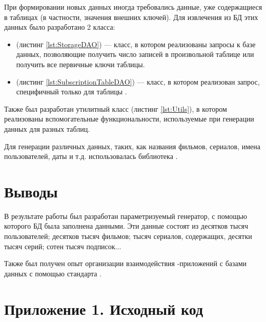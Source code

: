 \begin{enumerate}
	При формировании новых данных иногда требовались данные, уже содержащиеся в таблицах (в частности, значения внешних ключей). Для извлечения из БД этих данных было разработано 2 класса: 
	
	\begin{itemize}
		\item {} (листинг \ref{lst:StorageDAO}) --- класс, в котором реализованы  запросы к базе данных, позволяющие получить число записей в произвольной таблице или получить все первичные ключи таблицы.
		\item {} (листинг \ref{lst:SubscriptionTableDAO}) --- класс, в котором реализован  запрос, специфичный только для таблицы .
	\end{itemize}
	
	Также был разработан утилитный класс  (листинг \ref{lst:Utils}), в котором реализованы вспомогательные функциональности, используемые при генерации данных для разных таблиц.
	
	Для генерации различных данных, таких, как названия фильмов, сериалов, имена пользователей, даты и т.д. использовалась библиотека .
	
\end{enumerate}

\section{Выводы}

В результате работы был разработан параметризуемый генератор, с помощью которого БД была заполнена данными. Эти данные состоят из десятков тысяч пользователей; десятков тысяч фильмов; тысяч сериалов, содержащих, десятки тысяч серий; сотен тысяч подписок...

Также был получен опыт организации взаимодействия -приложений с базами данных с помощью стандарта .

\section*{Приложение 1. Исходный код}





